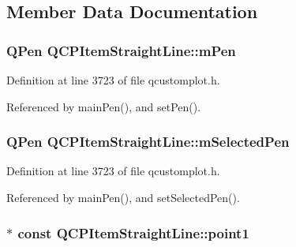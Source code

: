 \subsection{Member Data Documentation}
\hypertarget{class_q_c_p_item_straight_line_a15106ddc2ebd73ed5c1bc57aa92bee8f}{}
\subsubsection[{m\+Pen}]{\setlength{\rightskip}{0pt plus 5cm}Q\+Pen Q\+C\+P\+Item\+Straight\+Line\+::m\+Pen\hspace{0.3cm}{\ttfamily [protected]}}\label{class_q_c_p_item_straight_line_a15106ddc2ebd73ed5c1bc57aa92bee8f}


Definition at line 3723 of file qcustomplot.\+h.



Referenced by main\+Pen(), and set\+Pen().

\hypertarget{class_q_c_p_item_straight_line_a0307a0d56a018656adbf798bc84c2a4b}{}
\subsubsection[{m\+Selected\+Pen}]{\setlength{\rightskip}{0pt plus 5cm}Q\+Pen Q\+C\+P\+Item\+Straight\+Line\+::m\+Selected\+Pen\hspace{0.3cm}{\ttfamily [protected]}}\label{class_q_c_p_item_straight_line_a0307a0d56a018656adbf798bc84c2a4b}


Definition at line 3723 of file qcustomplot.\+h.



Referenced by main\+Pen(), and set\+Selected\+Pen().

\hypertarget{class_q_c_p_item_straight_line_ac131a6ffe456f2cc7364dce541fe0120}{}
\subsubsection[{point1}]{$\ast$ const Q\+C\+P\+Item\+Straight\+Line\+::point1}\label{class_q_c_p_item_straight_line_ac131a6ffe456f2cc7364dce541fe0120}


